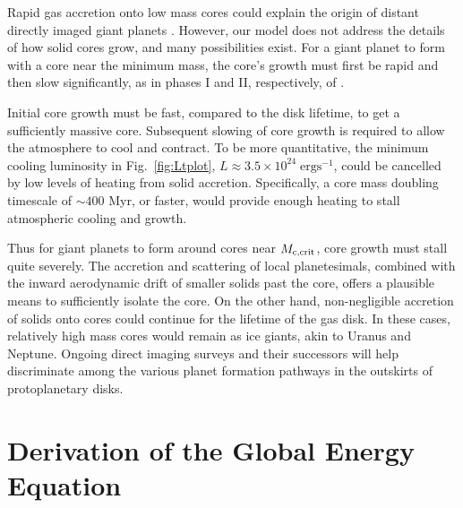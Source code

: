 \documentclass[apj, numberedappendix]{emulateapj}
\newcommand{\Fig}[1]{Fig.~\ref{#1}}
\def\crit{_{\rm{c, crit}}}
\begin{document}
Rapid gas accretion onto low mass cores could explain the origin of distant directly imaged giant planets \citep{marois08, lagrange10}.  However, our model does not address the details of how solid cores grow, and many possibilities exist.  For a giant planet to form with a core near the minimum mass, the core's growth must  first be rapid and then slow significantly, as in phases I and II, respectively, of \cite{pollack96}.   

Initial core growth must be fast, compared to the disk lifetime, to get a sufficiently massive core.  Subsequent slowing of core growth is required to allow the atmosphere to cool and contract.  To be more quantitative, the minimum cooling luminosity in \Fig{fig:Ltplot}, $L\approx 3.5 \times 10^{24}\;\mathrm{erg s}^{-1}$, could be cancelled by low levels of heating from solid accretion.  Specifically, a core mass doubling timescale of $\sim$$400$ Myr, or faster, would provide enough heating to stall atmospheric cooling and growth.  

Thus for giant planets to form around cores near $M\crit$, core growth must stall quite severely.   The accretion and scattering of local planetesimals, combined with the inward aerodynamic drift of smaller solids past the core, offers a plausible means to sufficiently isolate the core.  On the other hand, non-negligible accretion of solids onto cores could continue for the lifetime of the gas disk.  In these cases, relatively high mass cores would remain as ice giants, akin to Uranus and Neptune.   Ongoing direct imaging surveys and their successors \citep{hinz12, macintosh12} will help discriminate among the various planet formation pathways in the outskirts of protoplanetary disks.







\appendix
\section{Derivation of the Global Energy Equation}\label{sec:globalderiv}
\end{document}
